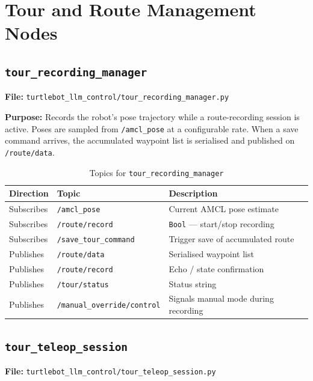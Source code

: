 \documentclass[12pt,a4paper]{report}
\newcommand{\topic}[1]{\texttt{\color{purple!80!black}#1}}
\newcommand{\file}[1]{\texttt{\color{black!70}#1}}
\newcommand{\node}[1]{\texttt{\color{Maroon}#1}}
\begin{document}
\section{Tour and Route Management Nodes}

\subsection{\node{tour\_recording\_manager}}
\label{sub:trm}

\textbf{File:} \file{turtlebot\_llm\_control/tour\_recording\_manager.py}

\textbf{Purpose:} Records the robot's pose trajectory while a route-recording
session is active.  Poses are sampled from \topic{/amcl\_pose} at a
configurable rate.  When a save command arrives, the accumulated waypoint list
is serialised and published on \topic{/route/data}.

\begin{table}[H]
  \centering
  \caption{Topics for \texttt{tour\_recording\_manager}}
  \begin{tabularx}{\linewidth}{L{3cm} L{5cm} X}
    \toprule
    \textbf{Direction} & \textbf{Topic} & \textbf{Description} \\
    \midrule
    Subscribes & \topic{/amcl\_pose}            & Current AMCL pose estimate \\
    Subscribes & \topic{/route/record}          & \texttt{Bool} — start/stop recording \\
    Subscribes & \topic{/save\_tour\_command}   & Trigger save of accumulated route \\
    \midrule
    Publishes  & \topic{/route/data}            & Serialised waypoint list \\
    Publishes  & \topic{/route/record}          & Echo / state confirmation \\
    Publishes  & \topic{/tour/status}           & Status string \\
    Publishes  & \topic{/manual\_override/control} & Signals manual mode during recording \\
    \bottomrule
  \end{tabularx}
\end{table}

\subsection{\node{tour\_teleop\_session}}
\label{sub:tts}

\textbf{File:} \file{turtlebot\_llm\_control/tour\_teleop\_session.py}
\end{document}
